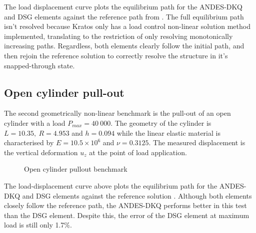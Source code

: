  
The load displacement curve plots the equilibrium path for the ANDES-DKQ and DSG elements against the reference path from \cite{Sze2004}. The full equilibrium path isn't resolved because Kratos only has a load control non-linear solution method implemented, translating to the restriction of only resolving monotonically increasing paths. Regardless, both elements clearly follow the initial path, and then rejoin the reference solution to correctly resolve the structure in it's snapped-through state.

\newpage
\subsection{Open cylinder pull-out}

The second geometrically non-linear benchmark is the pull-out of an open cylinder with a load $P_{max} = 40\ 000$. The geometry of the cylinder is $L= 10.35,\ R = 4.953$ and $h = 0.094$ while the linear elastic material is characterised by $E = 10.5\times10^6$ and $\nu = 0.3125$. The measured displacement is the vertical deformation $u_z$ at the point of load application.

 
\begin{figure}[H]
	\caption{\label{ref_label_overall}Open cylinder pullout benchmark}
\end{figure}

 The load-displacement curve above plots the equilibrium path for the ANDES-DKQ and DSG elements against the reference solution \cite{Sze2004}. Although both elements closely follow the reference path, the ANDES-DKQ performs better in this test than the DSG element. Despite this, the error of the DSG element at maximum load is still only 1.7\%.

